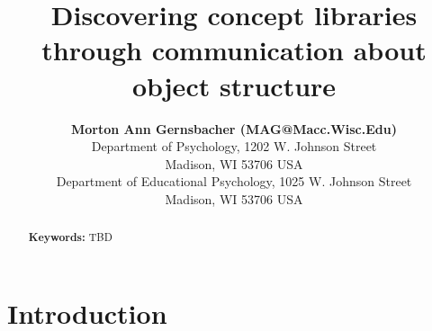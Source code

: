 \documentclass[10pt,letterpaper]{article}
\title{Discovering concept libraries through communication about object structure}
\author{{\large \bf Morton Ann Gernsbacher (MAG@Macc.Wisc.Edu)} \\
  Department of Psychology, 1202 W. Johnson Street \\
  Madison, WI 53706 USA
  \AND {\large \bf Sharon J.~Derry (SDJ@Macc.Wisc.Edu)} \\
  Department of Educational Psychology, 1025 W. Johnson Street \\
  Madison, WI 53706 USA}
\begin{document}
\maketitle


\begin{abstract}

\textbf{Keywords:} TBD
\end{abstract}


\section{Introduction} \label{sec-introduction}


\end{document}
